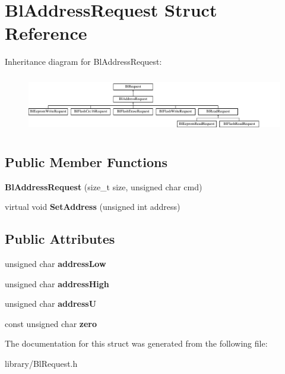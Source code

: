 \hypertarget{struct_bl_address_request}{\section{Bl\-Address\-Request Struct Reference}
\label{struct_bl_address_request}
}
Inheritance diagram for Bl\-Address\-Request\-:\begin{figure}[H]
\begin{center}
\leavevmode
\includegraphics[height=2.539683cm]{struct_bl_address_request}
\end{center}
\end{figure}
\subsection*{Public Member Functions}
\begin{DoxyCompactItemize}
\item 
\hypertarget{struct_bl_address_request_aff4bb182ecbd0b573d424db09b9516f2}{{\bfseries Bl\-Address\-Request} (size\-\_\-t size, unsigned char cmd)}\label{struct_bl_address_request_aff4bb182ecbd0b573d424db09b9516f2}

\item 
\hypertarget{struct_bl_address_request_add81e2ca67af34bf1c94e175a57656bf}{virtual void {\bfseries Set\-Address} (unsigned int address)}\label{struct_bl_address_request_add81e2ca67af34bf1c94e175a57656bf}

\end{DoxyCompactItemize}
\subsection*{Public Attributes}
\begin{DoxyCompactItemize}
\item 
\hypertarget{struct_bl_address_request_ae6a252f564542600cecd8c370ff25955}{unsigned char {\bfseries address\-Low}}\label{struct_bl_address_request_ae6a252f564542600cecd8c370ff25955}

\item 
\hypertarget{struct_bl_address_request_a9e30628b0954a18ed75ce920a33d72ee}{unsigned char {\bfseries address\-High}}\label{struct_bl_address_request_a9e30628b0954a18ed75ce920a33d72ee}

\item 
\hypertarget{struct_bl_address_request_afd1d17701a5905becce00ef6c0a0dbd0}{unsigned char {\bfseries address\-U}}\label{struct_bl_address_request_afd1d17701a5905becce00ef6c0a0dbd0}

\item 
\hypertarget{struct_bl_address_request_a04df4477476757417bfbd0b2b5a30a19}{const unsigned char {\bfseries zero}}\label{struct_bl_address_request_a04df4477476757417bfbd0b2b5a30a19}

\end{DoxyCompactItemize}


The documentation for this struct was generated from the following file\-:\begin{DoxyCompactItemize}
\item 
library/Bl\-Request.\-h\end{DoxyCompactItemize}
